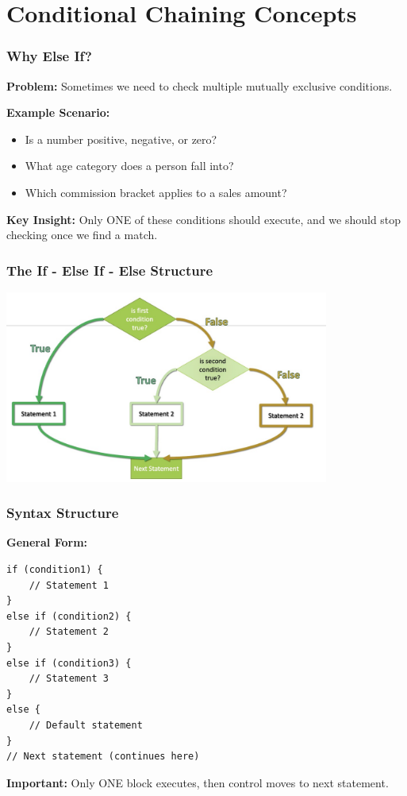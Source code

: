 \documentclass{beamer}
\begin{document}
\section{Conditional Chaining Concepts}

\begin{frame}
\frametitle{Why Else If?}
\textbf{Problem:} Sometimes we need to check multiple mutually exclusive conditions.\pause

\vspace{0.3cm}
\textbf{Example Scenario:}
\begin{itemize}
    \item Is a number positive, negative, or zero?
    \item What age category does a person fall into?
    \item Which commission bracket applies to a sales amount?
\end{itemize}\pause

\vspace{0.3cm}
\textbf{Key Insight:} Only ONE of these conditions should execute, and we should stop checking once we find a match.
\end{frame}

\begin{frame}
\frametitle{The If - Else If - Else Structure}

\begin{center}
\includegraphics[width=0.8\textwidth]{../images/06_else-if-flowchart.jpg}
\end{center}
\end{frame}

\begin{frame}[fragile]
\frametitle{Syntax Structure}
\textbf{General Form:}
\begin{verbatim}
if (condition1) {
    // Statement 1
}
else if (condition2) {
    // Statement 2
}
else if (condition3) {
    // Statement 3
}
else {
    // Default statement
}
// Next statement (continues here)
\end{verbatim}

\textbf{Important:} Only ONE block executes, then control moves to next statement.
\end{frame}
\end{document}
